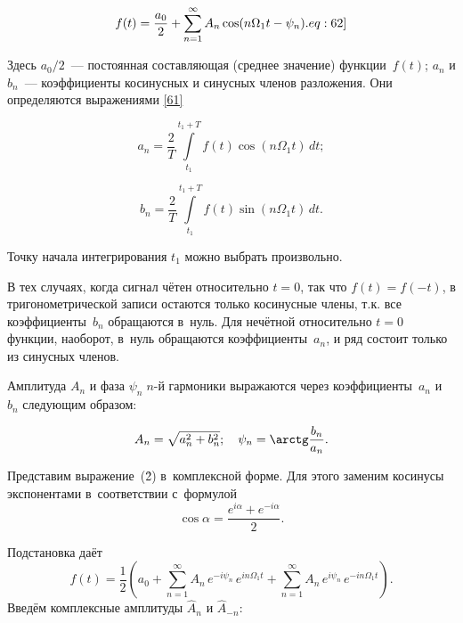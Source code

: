 \begin{equation}
	f(t)=\frac{a_0}{2}+ \sum_{n=1}^{\infty}A_n\cos(n\Omega_1 t-\psi_n).
	\eqmark[eq:62]
\end{equation}

Здесь $a_0/2$~--- постоянная составляющая (среднее значение) функции~$f(t)$; $a_n$ и $b_n$~--- коэффициенты косинусных и синусных членов разложения. Они определяются выражениями \eqref{61}

\begin{equation}
	a_n=\frac{2}{T}\int\limits_{t_1}^{t_1+T}\!\!f(t)\cos(n\Omega_1t)\,dt;
\end{equation}

\begin{equation}
	b_n =\frac{2}{T}\int\limits_{t_1}^{t_1+T}\!f(t)\sin(n\Omega_1t)\,dt.
\end{equation}

Точку начала интегрирования $t_1$ можно выбрать произвольно.

В тех случаях, когда сигнал чётен относительно $t=0$, так что $f(t)=f(-t)$, в тригонометрической записи остаются только косинусные члены, т.к. все коэффициенты~$b_n$ обращаются в~нуль. Для нечётной относительно $t=0$ функции, наоборот, в~нуль обращаются коэффициенты~$a_n$, и ряд состоит только из синусных членов.

Амплитуда $A_n$ и фаза $\psi_n\; n$-й гармоники выражаются через коэффициенты~$a_n$ и $b_n$ следующим образом:

\begin{equation}
	A_n=\sqrt{a_n^2+b_n^2};\quad \psi_n=\arctg\frac{b_n}{a_n}.
\end{equation}


Представим выражение~(\r2) в~комплексной форме. Для этого заменим косинусы экспонентами в~соответствии с~формулой
\begin{equation}
	\cos \alpha=\frac{e^{i\alpha}+e^{-i\alpha}}{2}.
\end{equation}

Подстановка даёт
\begin{equation}
f(t)=\frac{1}{2}\left(a_0+ \sum_{n=1}^{\infty}A_n\,e^{-i\psi_n}\,e^{in\Omega_1 t} +\sum_{n=1}^{\infty}A_n\,e^{i\psi_n}\,e^{-in\Omega_1 t}\right).	
\end{equation}
Введём комплексные амплитуды $\hat A_n$ и $\hat A_{-n}$:

